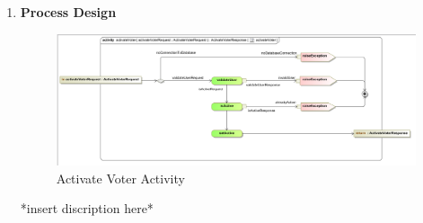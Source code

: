 \begin{enumerate}
\begin{enumerate}
			\item \textbf{Process Design}
			\begin{figure}[H]
				\centering
				\includegraphics[width=0.75\linewidth]{../Images/Database/Activity/ActivateVoter_Activity.png}
				\caption{Activate Voter Activity}
			\end{figure}
			
			*insert discription here*
			\newline
		\end{enumerate}
\end{enumerate}